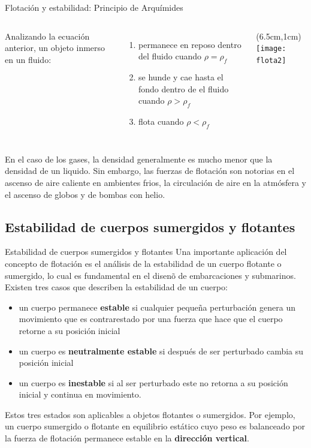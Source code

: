 \documentclass [xcolor=svgnames, t] {beamer}
\begin{document}
\begin{frame}{Flotaci\'on y estabilidad: Principio de Arqu\'imides}
\begin{columns}
Analizando la ecuaci\'on anterior, un objeto inmerso en un fluido: 
\begin{enumerate}
\item permanece en reposo dentro del fluido cuando $\rho = \rho_f$
\item se hunde y cae hasta el fondo dentro de el fluido cuando $\rho > \rho_f$ 
\item flota cuando $\rho < \rho_f$
\end{enumerate}
\begin{textblock*}{6cm}(6.5cm,1cm) %
\texttt{[image: flota2]}
\end{textblock*}
\end{columns}
\vspace{0.5cm}
En el caso de los gases, la densidad generalmente es mucho menor que la densidad de un liquido. Sin embargo, las fuerzas de flotaci\'on son notorias en el ascenso de aire caliente en ambientes frios, la circulaci\'on de aire en la atm\'osfera y el ascenso de globos y de bombas con helio. 
\end{frame}

\subsection{Estabilidad de cuerpos sumergidos y flotantes}
\begin{frame}{Estabilidad de cuerpos sumergidos y flotantes}
Una importante aplicaci\'on del concepto de flotaci\'on es el an\'alisis de la estabilidad de un cuerpo flotante o sumergido, lo cual es fundamental en el disen\~o de embarcaciones y submarinos. Existen tres casos que describen la estabilidad de un cuerpo: 
\begin{itemize}
\item un cuerpo permanece \textbf{estable} si cualquier peque\~na perturbaci\'on genera un movimiento que es contrarestado por una fuerza que hace que el cuerpo retorne a su posici\'on inicial
\item un cuerpo es \textbf{neutralmente estable} si despu\'es de ser perturbado cambia su posici\'on inicial
\item un cuerpo es \textbf{inestable} si al ser perturbado este no retorna a su posici\'on inicial y continua en movimiento. 
\end{itemize}
Estos tres estados son aplicables a objetos flotantes o sumergidos. Por ejemplo, un cuerpo sumergido o flotante en equilibrio est\'atico cuyo peso es balanceado por la fuerza de flotaci\'on permanece estable en la \textbf{direcci\'on vertical}.
\end{frame}
\end{document}
